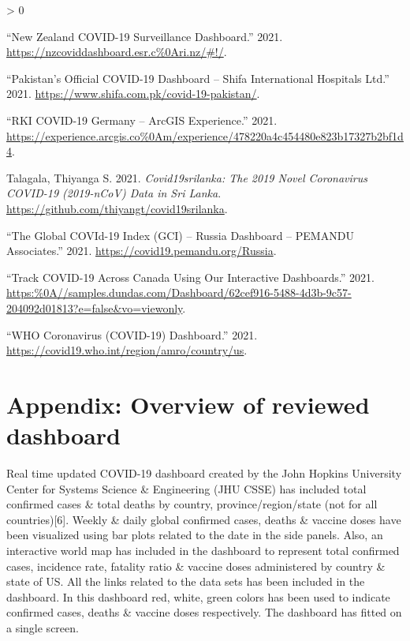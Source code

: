 \documentclass[
]{article}
\newlength{\cslhangindent}
\newenvironment{CSLReferences}[2] %
 {%
  \setlength{\parindent}{0pt}
  \ifodd #1 \everypar{\setlength{\hangindent}{\cslhangindent}}\ignorespaces\fi
  \ifnum #2 > 0
  \setlength{\parskip}{#2\baselineskip}
  \fi
 }%
 {}
\begin{document}
\begin{CSLReferences}{1}{0}
\leavevmode\hypertarget{ref-nz}{}%
{``{New Zealand COVID-19 Surveillance Dashboard}.''} 2021.
\url{https://nzcoviddashboard.esr.c\%0Ari.nz/\#!/}.

\leavevmode\hypertarget{ref-pakistan}{}%
{``{Pakistan's Official COVID-19 Dashboard -- Shifa International
Hospitals Ltd}.''} 2021.
\url{https://www.shifa.com.pk/covid-19-pakistan/}.

\leavevmode\hypertarget{ref-rki}{}%
{``{RKI COVID-19 Germany -- ArcGIS Experience}.''} 2021.
\url{https://experience.arcgis.co\%0Am/experience/478220a4c454480e823b17327b2bf1d4}.

\leavevmode\hypertarget{ref-talagala}{}%
Talagala, Thiyanga S. 2021. \emph{Covid19srilanka: The 2019 Novel
Coronavirus COVID-19 (2019-nCoV) Data in Sri Lanka}.
\url{https://github.com/thiyangt/covid19srilanka}.

\leavevmode\hypertarget{ref-russia}{}%
{``{The Global COVId-19 Index (GCI) -- Russia Dashboard -- PEMANDU
Associates}.''} 2021. \url{https://covid19.pemandu.org/Russia}.

\leavevmode\hypertarget{ref-canada}{}%
{``{Track COVID-19 Across Canada Using Our Interactive Dashboards}.''}
2021.
\url{https:\%0A//samples.dundas.com/Dashboard/62cef916-5488-4d3b-9c57-204092d01813?e=false\&vo=viewonly}.

\leavevmode\hypertarget{ref-who}{}%
{``{WHO Coronavirus (COVID-19) Dashboard}.''} 2021.
\url{https://covid19.who.int/region/amro/country/us}.

\end{CSLReferences}

\newpage

\hypertarget{appendix-overview-of-reviewed-dashboard}{%
\section{Appendix: Overview of reviewed
dashboard}\label{appendix-overview-of-reviewed-dashboard}}

Real time updated COVID-19 dashboard created by the John Hopkins
University Center for Systems Science \& Engineering (JHU CSSE) has
included total confirmed cases \& total deaths by country,
province/region/state (not for all countries){[}6{]}. Weekly \& daily
global confirmed cases, deaths \& vaccine doses have been visualized
using bar plots related to the date in the side panels. Also, an
interactive world map has included in the dashboard to represent total
confirmed cases, incidence rate, fatality ratio \& vaccine doses
administered by country \& state of US. All the links related to the
data sets has been included in the dashboard. In this dashboard red,
white, green colors has been used to indicate confirmed cases, deaths \&
vaccine doses respectively. The dashboard has fitted on a single screen.
\end{document}

